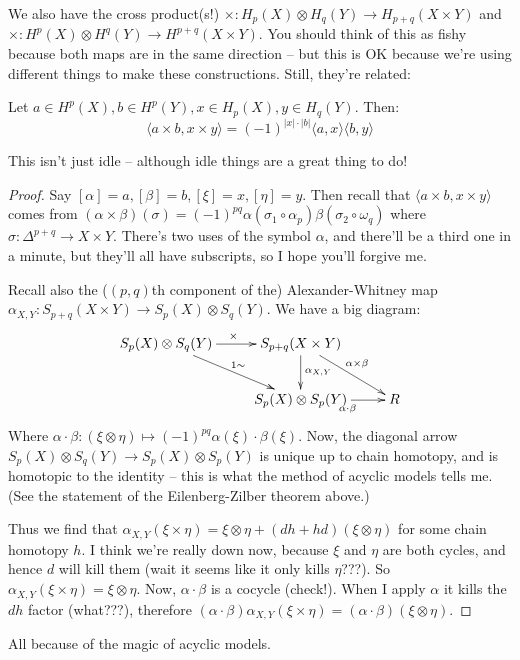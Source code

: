 We also have the cross product(s!) $\times: H_p(X)\otimes H_q(Y)\to H_{p+q}(X\times Y)$ and $\times: H^p(X)\otimes H^q(Y)\to H^{p+q}(X\times Y)$. You should think of this as fishy because both maps are in the same direction -- but this is OK because we're using different things to make these constructions. Still, they're related:
\begin{theorem}
Let $a\in H^p(X),b\in H^p(Y),x\in H_p(X), y\in H_q(Y)$. Then:
\begin{equation*}
\langle a\times b,x\times y\rangle=(-1)^{|x|\cdot |b|}\langle a,x\rangle\langle b,y\rangle
\end{equation*}
\end{theorem}
This isn't just idle -- although idle things are a great thing to do!
\begin{proof}
Say $[\alpha]=a,[\beta]=b,[\xi]=x,[\eta]=y$. Then recall that $\langle a\times b,x\times y\rangle$ comes from $(\alpha\times\beta)(\sigma)=(-1)^{pq}\alpha(\sigma_1\circ\alpha_p)\beta(\sigma_2\circ\omega_q)$ where $\sigma:\Delta^{p+q}\to X\times Y$. There's two uses of the symbol $\alpha$, and there'll be a third one in a minute, but they'll all have subscripts, so I hope you'll forgive me.

Recall also the ($(p,q)$th component of the) Alexander-Whitney map $\alpha_{X,Y}:S_{p+q}(X\times Y)\to S_p(X)\otimes S_q(Y)$. We have a big diagram:
\begin{equation*}
\xymatrix{
	S_p(X)\otimes S_q(Y)\ar[r]^{\times}\ar[dr]^{1\sim} & S_{p+q}(X\times Y)\ar[d]^{\alpha_{X,Y}}\ar[dr]^{\alpha\times\beta} & \\
	& S_p(X)\otimes S_p(Y)\ar[r]_{\alpha\cdot\beta} & R
}
\end{equation*}
Where $\alpha\cdot\beta:(\xi\otimes\eta)\mapsto(-1)^{pq}\alpha(\xi)\cdot\beta(\xi)$. Now, the diagonal arrow $S_p(X)\otimes S_q(Y)\to S_p(X)\otimes S_p(Y)$ is unique up to chain homotopy, and is homotopic to the identity -- this is what the method of acyclic models tells me. (See the statement of the Eilenberg-Zilber theorem above.)

Thus we find that $\alpha_{X,Y}(\xi\times\eta)=\xi\otimes\eta+(dh+hd)(\xi\otimes\eta)$ for some chain homotopy $h$. I think we're really down now, because $\xi$ and $\eta$ are both cycles, and hence $d$ will kill them (wait it seems like it only kills $\eta$???). So $\alpha_{X,Y}(\xi\times\eta)=\xi\otimes\eta$. Now, $\alpha\cdot\beta$ is a cocycle (check!). When I apply $\alpha$ it kills the $dh$ factor (what???), therefore $(\alpha\cdot\beta)\alpha_{X,Y}(\xi\times \eta)=(\alpha\cdot\beta)(\xi\otimes\eta)$.
\end{proof}
All because of the magic of acyclic models.

